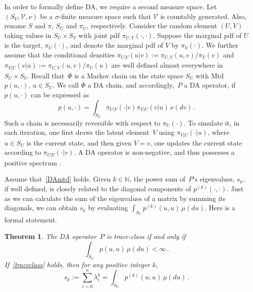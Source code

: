 \documentclass[11pt]{article}
\newtheorem{theorem}{Theorem}
\begin{document}
        In order to formally define DA, we require a second measure
        space.  Let $(S_V, \mathcal{V}, \nu)$ be a $\sigma$-finite
        measure space such that $\mathcal{V}$ is countably generated.
        Also, rename $S$ and $\pi$, $S_U$ and $\pi_U$, respectively.
        Consider the random element $(U,V)$ taking values in $S_U
        \times S_V$ with joint pdf $\pi_{U,V}(\cdot,\cdot).$ Suppose
        the marginal pdf of $U$ is the target, $\pi_U(\cdot)$, and
        denote the marginal pdf of $V$ by $\pi_V(\cdot).$ We further
        assume that the conditional densities $\pi_{U|V}(u|v) :=
        \pi_{U,V}(u,v)/\pi_V(v)$ and $\pi_{V|U}(v|u) :=
        \pi_{U,V}(u,v)/\pi_U(u)$ are well defined almost everywhere in
        $S_U \times S_V.$ Recall that~$\Phi$ is a Markov chain on the
        state space $S_U$ with Mtd $p(u,\cdot),\, u \in S_U.$ We call
        $\Phi$ a DA chain, and accordingly,~$P$ a DA operator, if
        $p(u,\cdot)$ can be expressed as
	\begin{equation} \label{DAmtd} p(u,\cdot) = \int_{S_V}
          \pi_{U|V}(\cdot|v) \pi_{V|U}(v|u) \, \nu(dv) \,.
	\end{equation}
	Such a chain is necessarily reversible with respect to $\pi_U(\cdot)$. 
	To simulate it, in each iteration, one first
        draws the latent element~$V$ using $\pi_{V|U}(\cdot|u)$, where
        $u \in S_U$ is the current state, and then given $V=v$, one
        updates the current state according to $\pi_{U|V}(\cdot|v)$.
        A DA operator is non-negative, and thus
        possesses a positive spectrum \citep{liu:wong:kong:1994}.
	
	Assume that~\eqref{DAmtd} holds. Given $k \in \mathbb{N}$, the power sum of~$P$'s eigenvalues,
        $s_k,$ if well defined, is closely related to the diagonal
        components of $p^{(k)}(\cdot,\cdot).$ Just as we can calculate
        the sum of the eigenvalues of a matrix by summing its
        diagonals, we can obtain $s_k$ by evaluating $\int_{S_U}
        p^{(k)}(u,u) \, \mu(du)$.  Here is a formal statement.
	
	\begin{theorem} \label{basic}
		The DA operator~$P$ is trace-class if and only if
		\begin{equation} \label{traceclass}
		\int_{S_U} p(u,u) \, \mu(du) < \infty \,.
		\end{equation}
		If~\eqref{traceclass} holds, then for any positive
                integer $k,$
		\begin{equation} \label{sum=int} s_k :=
                  \sum_{i=0}^{\kappa} \lambda_i^k = \int_{S_U}
                  p^{(k)}(u,u) \, \mu(du) \,.
		\end{equation}
	\end{theorem}
\end{document}
